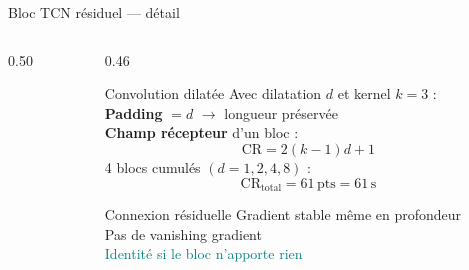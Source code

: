 \documentclass[aspectratio=169, 10pt]{beamer}
\begin{document}
\begin{frame}{Bloc TCN résiduel — détail}
\begin{columns}[T]
\begin{column}{0.50\textwidth}
        \end{column}
        \begin{column}{0.46\textwidth}
            \begin{block}{\small Convolution dilatée}
                \small Avec dilatation $d$ et kernel $k=3$ :\\[3pt]
                \textbf{Padding} $= d$ $\to$ longueur préservée\\[3pt]
                \textbf{Champ récepteur} d'un bloc :
                \[ \text{CR} = 2(k-1)d + 1 \]
                4 blocs cumulés $(d=1,2,4,8)$ :
                \[ \text{CR}_\text{total} = 61\,\text{pts} = 61\,\text{s} \]
            \end{block}
            \vspace{0.15cm}
            \begin{block}{\small Connexion résiduelle}
                \small Gradient stable même en profondeur\\
                Pas de vanishing gradient\\
                \textcolor{Teal}{Identité si le bloc n'apporte rien}
            \end{block}
        \end{column}
    \end{columns}
\end{frame}
\end{document}
